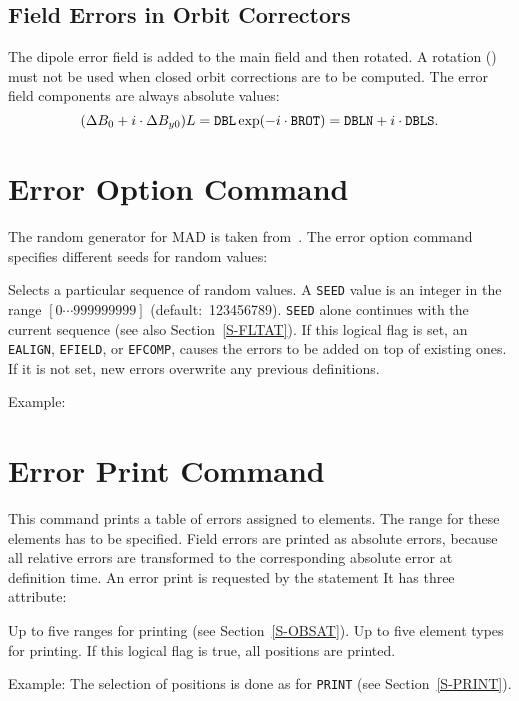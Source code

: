\subsection{Field Errors in Orbit Correctors}
The dipole error field is added to the main field and then rotated.
A rotation () must not be used when closed orbit corrections
are to be computed.
The error field components are always absolute values:
\[
(\Delta B_{0}+i\cdot\Delta B_{y0})L=\hbox{\tt DBL}\exp(-i\cdot\hbox{\tt BROT})=
\hbox{\tt DBLN}+i\cdot\hbox{\tt DBLS}.
\]
 
\section{Error Option Command}
\label{S-EOPTCOM}
The random generator for MAD is taken from~\cite{B-KNUTH}.
The error option command specifies different seeds for random values:
\begin{mylist}
Selects a particular sequence of random values.
A {\tt SEED} value is an integer in the range \([0 \cdots 999999999]\)
(default:~123456789).
{\tt SEED} alone continues with the current sequence
(see also Section~\ref{S-FLTAT}).
If this logical flag is set,
an {\tt EALIGN}, {\tt EFIELD}, or {\tt EFCOMP}, causes the errors to
be added on top of existing ones.
If it is not set,
new errors overwrite any previous definitions.
\end{mylist}
Example:
 
\section{Error Print Command}
\label{S-EPRICOM}
This command prints a table of errors assigned to elements.
The range for these elements has to be specified.
Field errors are printed as absolute errors,
because all relative errors are transformed to the corresponding
absolute error at definition time.
An error print is requested by the  statement
It has three attribute:
\begin{mylist}
Up to five ranges for printing (see Section~\ref{S-OBSAT}).
Up to five element types for printing.
If this logical flag is true, all positions are printed.
\end{mylist}
Example:
The selection of positions is done as for {\tt PRINT}
(see Section~\ref{S-PRINT}).
 
